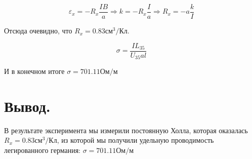 \documentclass[a4paper,12pt]{article} %
\begin{document}
\begin{equation*}
\varepsilon_x = -R_x \frac{I B}{a} \Rightarrow k = -R_x \frac{I}{a} \Rightarrow R_x = - a\frac{k}{I}
\end{equation*}

Отсюда очевидно, что $R_x = 0.83 \text{см}^3/\text{Кл}$.

\begin{equation*}
\sigma = \frac{I L_{35}}{U_{35} a l}
\end{equation*}

И в конечном итоге $\sigma = 701.11 \text{Ом/м}$

\section{Вывод.}

В результате эксперимента мы измерили постоянную Холла, которая оказалась $R_x = 0.83 \text{см}^3/\text{Кл}$, из которой мы получили удельную проводимость легированного германия: $\sigma = 701.11 \text{Ом/м}$
\end{document}
